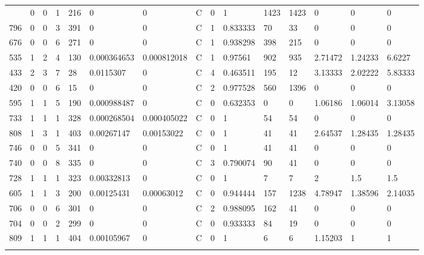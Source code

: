 \begin{latin}
\begin{longtable}{lllllllllllllll}
\begin{comment}
	621 & 0  & 0   & 1  & 216 & 0              & 0              & C & 0  & 1        & 1423 & 1423 & 0       & 0       & 0       \\
	796 & 0  & 0   & 3  & 391 & 0              & 0              & C & 1  & 0.833333 & 70   & 33   & 0       & 0       & 0       \\
	676 & 0  & 0   & 6  & 271 & 0              & 0              & C & 1  & 0.938298 & 398  & 215  & 0       & 0       & 0       \\
	535 & 1  & 2   & 4  & 130 & 0.000364653    & 0.000812018    & C & 1  & 0.97561  & 902  & 935  & 2.71472 & 1.24233 & 6.6227  \\
	433 & 2  & 3   & 7  & 28  & 0.0115307      & 0              & C & 4  & 0.463511 & 195  & 12   & 3.13333 & 2.02222 & 5.83333 \\
	420 & 0  & 0   & 6  & 15  & 0              & 0              & C & 2  & 0.977528 & 560  & 1396 & 0       & 0       & 0       \\
	595 & 1  & 1   & 5  & 190 & 0.000988487    & 0              & C & 0  & 0.632353 & 0    & 0    & 1.06186 & 1.06014 & 3.13058 \\
	733 & 1  & 1   & 1  & 328 & 0.000268504    & 0.000405022    & C & 0  & 1        & 54   & 54   & 0       & 0       & 0       \\
	808 & 1  & 3   & 1  & 403 & 0.00267147     & 0.00153022     & C & 0  & 1        & 41   & 41   & 2.64537 & 1.28435 & 1.28435 \\
	746 & 0  & 0   & 5  & 341 & 0              & 0              & C & 0  & 1        & 41   & 41   & 0       & 0       & 0       \\
	740 & 0  & 0   & 8  & 335 & 0              & 0              & C & 3  & 0.790074 & 90   & 41   & 0       & 0       & 0       \\
	728 & 1  & 1   & 1  & 323 & 0.00332813     & 0              & C & 0  & 1        & 7    & 7    & 2       & 1.5     & 1.5     \\
	605 & 1  & 1   & 3  & 200 & 0.00125431     & 0.00063012     & C & 0  & 0.944444 & 157  & 1238 & 4.78947 & 1.38596 & 2.14035 \\
	706 & 0  & 0   & 6  & 301 & 0              & 0              & C & 2  & 0.988095 & 162  & 41   & 0       & 0       & 0       \\
	704 & 0  & 0   & 2  & 299 & 0              & 0              & C & 0  & 0.933333 & 84   & 19   & 0       & 0       & 0       \\
	809 & 1  & 1   & 1  & 404 & 0.00105967     & 0              & C & 0  & 1        & 6    & 6    & 1.15203 & 1       & 1       \\

\end{comment}
\end{longtable}
\end{latin}
